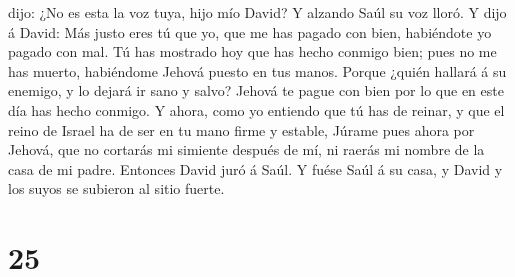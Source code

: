 dijo: ¿No es esta la voz tuya, hijo mío David? Y alzando Saúl su voz
lloró.  Y dijo á David: Más justo eres tú que yo, que me
has pagado con bien, habiéndote yo pagado con mal.  Tú
has mostrado hoy que has hecho conmigo bien; pues no me has muerto,
habiéndome Jehová puesto en tus manos.  Porque ¿quién
hallará á su enemigo, y lo dejará ir sano y salvo? Jehová te pague con
bien por lo que en este día has hecho conmigo.  Y ahora,
como yo entiendo que tú has de reinar, y que el reino de Israel ha de
ser en tu mano firme y estable,  Júrame pues ahora por
Jehová, que no cortarás mi simiente después de mí, ni raerás mi nombre
de la casa de mi padre. Entonces David juró á Saúl. Y fuése Saúl á su
casa, y David y los suyos se subieron al sitio fuerte.

\hypertarget{section-24}{%
\section{25}\label{section-24}}

